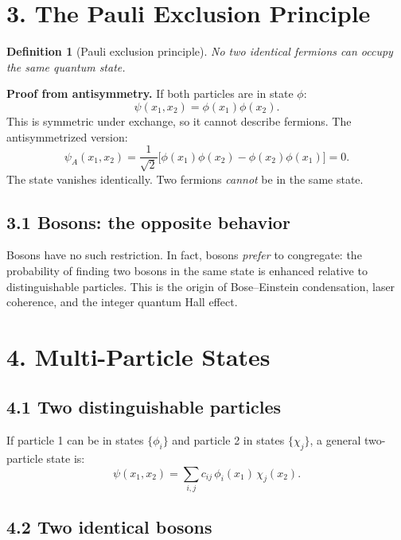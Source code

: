\documentclass[12pt,a4paper]{article}
\newtheorem{definition}{Definition}
\begin{document}
\section{3. The Pauli Exclusion Principle}

\begin{definition}[Pauli exclusion principle]
No two identical fermions can occupy the same quantum state.
\end{definition}

\noindent\textbf{Proof from antisymmetry.}  If both particles are in state $\phi$:
\[
    \psi(x_1, x_2) = \phi(x_1)\phi(x_2).
\]
This is symmetric under exchange, so it cannot describe fermions.  The antisymmetrized version:
\[
    \psi_A(x_1, x_2) = \frac{1}{\sqrt{2}}\bigl[\phi(x_1)\phi(x_2) - \phi(x_2)\phi(x_1)\bigr] = 0.
\]
The state vanishes identically.  Two fermions \emph{cannot} be in the same state.

\subsection{3.1 Bosons: the opposite behavior}

Bosons have no such restriction.  In fact, bosons \emph{prefer} to congregate: the probability of finding two bosons in the same state is enhanced relative to distinguishable particles.  This is the origin of Bose--Einstein condensation, laser coherence, and the integer quantum Hall effect.

\section{4. Multi-Particle States}

\subsection{4.1 Two distinguishable particles}

If particle 1 can be in states $\{\phi_i\}$ and particle 2 in states $\{\chi_j\}$, a general two-particle state is:
\[
    \psi(x_1, x_2) = \sum_{i,j} c_{ij}\,\phi_i(x_1)\,\chi_j(x_2).
\]

\subsection{4.2 Two identical bosons}
\end{document}
